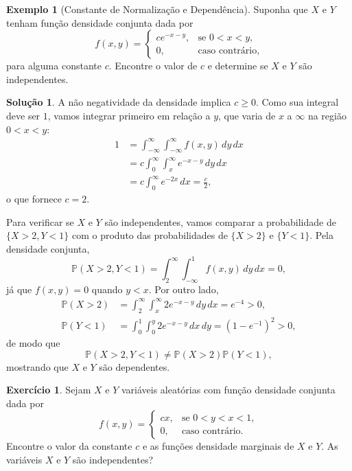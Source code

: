 \documentclass[12pt,portuguese]{article}
\theoremstyle{definition}
\newtheorem{example}[example]{Exemplo}
\theoremstyle{plainexercise}
\newtheorem{exercise}{Exercício}
\theoremstyle{starredexercise}
\theoremstyle{definition}
\newtheorem*{solution}{Solução}
\begin{document}
\begin{example}[Constante de Normalização e Dependência]\label{ex:constante-normalizacao-dependencia}
  Suponha que $X$ e $Y$ tenham função densidade conjunta dada por
  \begin{equation}\label{eq:densidade-conjunta-dependente}
    f(x, y) =
    \begin{cases}
      c e^{-x-y}, & \text{se } 0 < x < y, \\[0.2cm]
      0, & \text{caso contrário},
    \end{cases}
  \end{equation}
  para alguma constante $c$. Encontre o valor de $c$ e determine se $X$ e $Y$
  são independentes.
  \begin{solution}
    A não negatividade da densidade implica $c \geqslant 0$. Como sua
    integral deve ser $1$, vamos integrar primeiro em relação a $y$,
    que varia de $x$ a $\infty$ na região $0<x<y$:
    \begin{align*}
      1
      &= \int_{-\infty}^{\infty}\int_{-\infty}^{\infty}
      f(x, y)\,dy\,dx
      \\[0.3cm]
      &= c\int_{0}^{\infty}\int_{x}^{\infty} e^{-x-y}\,dy\,dx
      \\[0.3cm]
      &= c\int_0^{\infty} e^{-2x}\,dx = \frac{c}{2},
    \end{align*}
    o que fornece $c=2$.

    Para verificar se $X$ e $Y$ são independentes, vamos comparar a
    probabilidade de $\{X>2,Y<1\}$ com o produto das probabilidades
    de $\{X>2\}$ e $\{Y<1\}$. Pela densidade conjunta,
    \[
      \mathbb{P}(X > 2, Y < 1) = \int_{2}^{\infty} \int_{-\infty}^{1}
      f(x, y)\,dy\,dx = 0,
    \]
    já que $f(x,y)=0$ quando $y<x$. Por outro lado,
    \begin{align*}
      \mathbb{P}(X > 2)
      &= \int_2^{\infty}\int_x^{\infty} 2e^{-x-y}\,dy\,dx
      = e^{-4} > 0,
      \\[0.3cm]
      \mathbb{P}(Y < 1)
      &= \int_0^1\int_0^y 2e^{-x-y}\,dx\,dy
      = (1-e^{-1})^2 > 0,
    \end{align*}
    de modo que
    \[
      \mathbb{P}(X > 2, Y < 1) \neq \mathbb{P}(X > 2)\mathbb{P}(Y < 1),
    \]
    mostrando que $X$ e $Y$ são dependentes.
  \end{solution}
\end{example}

\begin{exercise}\label{exercise:densidades-marginais-e-independencia}
  Sejam $X$ e $Y$ variáveis aleatórias com função densidade conjunta dada por
  \[
    f(x, y) =
    \begin{cases}
      cx, & \text{se } 0 < y < x < 1, \\[0.2cm]
      0, & \text{caso contrário}.
    \end{cases}
  \]
  Encontre o valor da constante $c$ e as funções densidade marginais de $X$
  e $Y$. As variáveis $X$ e $Y$ são independentes?
\end{exercise}
\end{document}
